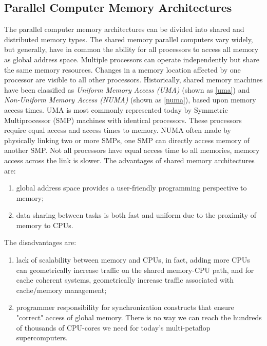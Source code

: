 \subsection{Parallel Computer Memory Architectures}

The parallel computer memory architectures can be divided into shared and distributed memory types. The shared memory parallel computers vary widely, but generally, have in common the ability for all processors to access all memory as global address space. Multiple processors can operate independently but share the same memory resources. Changes in a memory location affected by one processor are visible to all other processors. Historically, shared memory machines have been classified as \textit{Uniform Memory Access (UMA)} (shown as \ref{uma}) and \textit{Non-Uniform Memory Access (NUMA)} (shown as \ref{numa}), based upon memory access times. UMA is most commonly represented today by Symmetric Multiprocessor (SMP) machines with identical processors. These processors require equal access and access times to memory. NUMA often made by physically linking two or more SMPs, one SMP can directly access memory of another SMP. Not all processors have equal access time to all memories, memory access across the link is slower. The advantages of shared memory architectures are: 

\begin{enumerate}
	\item  global address space provides a user-friendly programming perspective to memory; 
	\item  data sharing between tasks is both fast and uniform due to the proximity of memory to CPUs.
\end{enumerate}

The disadvantages are:
\begin{enumerate}
	\item lack of scalability between memory and CPUs, in fact, adding more CPUs can geometrically increase traffic on the shared memory-CPU path, and for cache coherent systems, geometrically increase traffic associated with cache/memory management; 
	\item programmer responsibility for synchronization constructs that ensure "correct" access of global memory. There is no way we can reach the hundreds of thousands of CPU-cores we need for today’s multi-petaflop supercomputers.
\end{enumerate}

